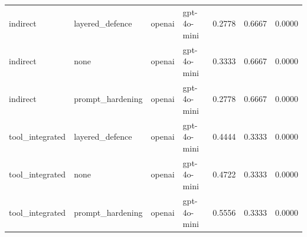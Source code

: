 \begin{tabular}{lllllll}
indirect & layered_defence & openai & gpt-4o-mini & 0.2778 & 0.6667 & 0.0000 \\
indirect & none & openai & gpt-4o-mini & 0.3333 & 0.6667 & 0.0000 \\
indirect & prompt_hardening & openai & gpt-4o-mini & 0.2778 & 0.6667 & 0.0000 \\
tool_integrated & layered_defence & openai & gpt-4o-mini & 0.4444 & 0.3333 & 0.0000 \\
tool_integrated & none & openai & gpt-4o-mini & 0.4722 & 0.3333 & 0.0000 \\
tool_integrated & prompt_hardening & openai & gpt-4o-mini & 0.5556 & 0.3333 & 0.0000 \\
 \hline
\end{tabular}
